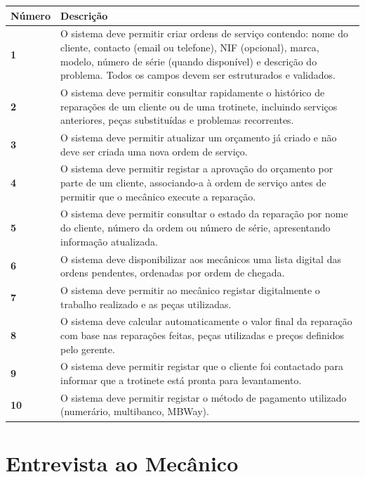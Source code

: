 \documentclass[11pt,a4paper]{article}
\begin{document}
	\begin{tabularx}{\textwidth}{@{}|l|X|@{}}
		\hline
		\rowcolor{gray!10} \textbf{Número} & \textbf{Descrição} \\ \hline
		\textbf{1} &  O sistema deve permitir criar ordens de serviço contendo: nome do cliente, contacto (email ou telefone), NIF (opcional), marca, modelo, número de série (quando disponível) e descrição do problema. Todos os campos devem ser estruturados e validados. \\ \hline
		\textbf{2} &  O sistema deve permitir consultar rapidamente o histórico de reparações de um cliente ou de uma trotinete, incluindo serviços anteriores, peças substituídas e problemas recorrentes. \\ \hline
		\textbf{3} &  O sistema deve permitir atualizar um orçamento já criado e não deve ser criada uma nova ordem de serviço. \\ \hline
		\textbf{4} &  O sistema deve permitir registar a aprovação do orçamento por parte de um cliente, associando-a à ordem de serviço antes de permitir que o mecânico execute a reparação.  \\ \hline
		\textbf{5} & O sistema deve permitir consultar o estado da reparação por nome do cliente, número da ordem ou número de série, apresentando informação atualizada. \\ \hline
		\textbf{6} &  O sistema deve disponibilizar aos mecânicos uma lista digital das ordens pendentes, ordenadas por ordem de chegada. \\ \hline
		\textbf{7} &  O sistema deve permitir ao mecânico registar digitalmente o trabalho realizado e as peças utilizadas. \\ \hline
		\textbf{8} &   O sistema deve calcular automaticamente o valor final da reparação com base nas reparações feitas, peças utilizadas e preços definidos pelo gerente. \\ \hline
		\textbf{9} &  O sistema deve permitir registar que o cliente foi contactado para informar que a trotinete está pronta para levantamento. \\ \hline
		\textbf{10} &  O sistema deve permitir registar o método de pagamento utilizado (numerário, multibanco, MBWay).  \\ \hline
		
	\end{tabularx}
	
	\vspace{1cm}
	
	\section*{Entrevista ao Mecânico}
	
\end{document}
